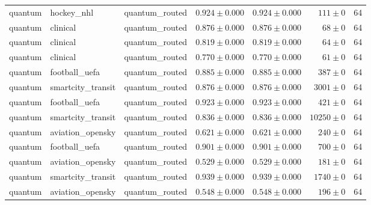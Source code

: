 \begin{table}[htbp]
\begin{tabular}{l l l r r r r}
quantum & hockey\_nhl & quantum\_routed & $0.924\pm0.000$ & $0.924\pm0.000$ & $111\pm0$ & 64 \\
quantum & clinical & quantum\_routed & $0.876\pm0.000$ & $0.876\pm0.000$ & $68\pm0$ & 64 \\
quantum & clinical & quantum\_routed & $0.819\pm0.000$ & $0.819\pm0.000$ & $64\pm0$ & 64 \\
quantum & clinical & quantum\_routed & $0.770\pm0.000$ & $0.770\pm0.000$ & $61\pm0$ & 64 \\
quantum & football\_uefa & quantum\_routed & $0.885\pm0.000$ & $0.885\pm0.000$ & $387\pm0$ & 64 \\
quantum & smartcity\_transit & quantum\_routed & $0.876\pm0.000$ & $0.876\pm0.000$ & $3001\pm0$ & 64 \\
quantum & football\_uefa & quantum\_routed & $0.923\pm0.000$ & $0.923\pm0.000$ & $421\pm0$ & 64 \\
quantum & smartcity\_transit & quantum\_routed & $0.836\pm0.000$ & $0.836\pm0.000$ & $10250\pm0$ & 64 \\
quantum & aviation\_opensky & quantum\_routed & $0.621\pm0.000$ & $0.621\pm0.000$ & $240\pm0$ & 64 \\
quantum & football\_uefa & quantum\_routed & $0.901\pm0.000$ & $0.901\pm0.000$ & $700\pm0$ & 64 \\
quantum & aviation\_opensky & quantum\_routed & $0.529\pm0.000$ & $0.529\pm0.000$ & $181\pm0$ & 64 \\
quantum & smartcity\_transit & quantum\_routed & $0.939\pm0.000$ & $0.939\pm0.000$ & $1740\pm0$ & 64 \\
quantum & aviation\_opensky & quantum\_routed & $0.548\pm0.000$ & $0.548\pm0.000$ & $196\pm0$ & 64 \\
\hline
\end{tabular}
\end{table}

